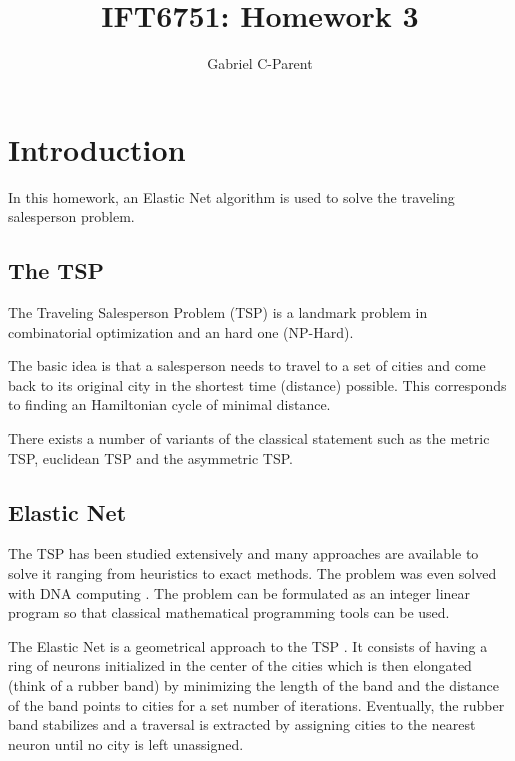 \documentclass{article} %
\author{
Gabriel C-Parent\\
}
\begin{document}
\title{IFT6751: Homework 3}
      
\maketitle
\section{Introduction}

In this homework, an Elastic Net algorithm is used to solve the traveling salesperson problem.

\subsection{The TSP}

The Traveling Salesperson Problem (TSP) is a landmark problem in combinatorial optimization and an hard one (NP-Hard)\citep{euc_tsp_complete}.\newline

The basic idea is that a salesperson needs to travel to a set of cities and come back to its original city in the shortest time (distance) possible. This corresponds to finding an Hamiltonian cycle of minimal distance.\newline

There exists a number of variants of the classical statement such as the metric TSP, euclidean TSP and the asymmetric TSP. 



\subsection{Elastic Net}

The TSP has been studied extensively and many approaches are available to solve it ranging from heuristics to exact methods. The problem was even solved with DNA computing \citep{adleman}. The problem can be formulated as an integer linear program so that classical mathematical programming tools can be used.\newline

The Elastic Net is a geometrical approach to the TSP \citep{en_original}. It consists of having a ring of neurons initialized in the center of the cities which is then elongated (think of a rubber band) by minimizing the length of the band and the distance of the band points to cities for a set number of iterations. Eventually, the rubber band stabilizes and a traversal is extracted by assigning cities to the nearest neuron until no city is left unassigned.\newline
\end{document}
